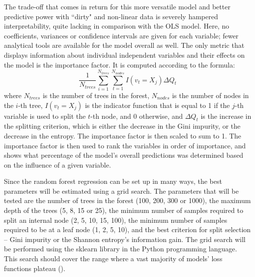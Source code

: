 \documentclass[12pt]{report}
\begin{document}
The trade-off that comes in return for this more versatile model and better predictive power with ``dirty" and non-linear data is severely hampered interpretability, quite lacking in comparison with the OLS model. Here, no coefficients, variances or confidence intervals are given for each variable; fewer analytical tools are available for the model overall as well. The only metric that displays information about individual independent variables and their effects on the model is the importance factor. It is computed according to the formula:
\begin{equation}
	\frac{1}{N_{trees}} \sum_{i=1}^{N_{trees}} \sum_{t=1}^{N_{nodes}} I(v_{t} = X_j) \Delta Q_{t}
\end{equation}
where $N_{trees}$ is the number of trees in the forest, $N_{nodes}$ is the number of nodes in the $i$-th tree, $I(v_{t} = X_j)$ is the indicator function that is equal to 1 if the $j$-th variable is used to split the $t$-th node, and 0 otherwise, and $\Delta Q_{t}$ is the increase in the splitting criterion, which is either the decrease in the Gini impurity, or the decrease in the entropy. The importance factor is then scaled to sum to 1. The importance factor is then used to rank the variables in order of importance, and shows what percentage of the model's overall predictions was determined based on the influence of a given variable.

Since the random forest regression can be set up in many ways, the best parameters will be estimated using a grid search. The parameters that will be tested are the number of trees in the forest (100, 200, 300 or 1000), the maximum depth of the trees (5, 8, 15 or 25), the minimum number of samples required to split an internal node (2, 5, 10, 15, 100), the minimum number of samples required to be at a leaf node (1, 2, 5, 10), and the best criterion for split selection -- Gini impurity or the Shannon entropy's information gain. The grid search will be performed using the sklearn library in the Python programming language. This search should cover the range where a vast majority of models' loss functions plateau (\cite[p. 354]{neloy2019}).
\end{document}
